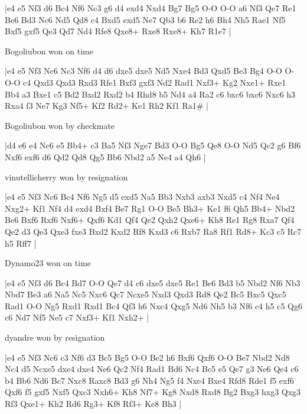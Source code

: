 \makegametitle
|e4 e5 Nf3 d6 Bc4 Nf6 Nc3 g6 d4 exd4 Nxd4 Bg7 Bg5 O-O O-O a6 Nf3 Qe7 Re1 Be6 Bd3 Nc6 Nd5 Qd8 c4 Bxd5 exd5 Ne7 Qb3 b6 Re2 h6 Bh4 Nh5 Rae1 Nf5 Bxf5 gxf5 Qe3 Qd7 Nd4 Rfe8 Qxe8+ Rxe8 Rxe8+ Kh7 R1e7  |

\showboard

Bogoliubon won on time

\makegametitle
|e4 e5 Nf3 Nc6 Nc3 Nf6 d4 d6 dxe5 dxe5 Nd5 Nxe4 Bd3 Qxd5 Be3 Bg4 O-O O-O-O c4 Qxd3 Qxd3 Rxd3 Rfe1 Bxf3 gxf3 Nd2 Rad1 Nxf3+ Kg2 Nxe1+ Rxe1 Bb4 a3 Bxe1 c5 Bd2 Bxd2 Rxd2 b4 Rhd8 b5 Nd4 a4 Ra2 c6 bxc6 bxc6 Nxc6 h3 Rxa4 f3 Ne7 Kg3 Nf5+ Kf2 Rd2+ Ke1 Rh2 Kf1 Ra1\#  |

\showboard

Bogoliubon won by checkmate

\makegametitle
|d4 e6 e4 Nc6 e5 Bb4+ c3 Ba5 Nf3 Nge7 Bd3 O-O Bg5 Qe8 O-O Nd5 Qc2 g6 Bf6 Nxf6 exf6 d6 Qd2 Qd8 Qg5 Bb6 Nbd2 a5 Ne4 a4 Qh6  |

\showboard

vinutellicherry won by resignation

\makegametitle
|e4 e5 Nf3 Nc6 Bc4 Nf6 Ng5 d5 exd5 Na5 Bb3 Nxb3 axb3 Nxd5 c4 Nf4 Ne4 Nxg2+ Kf1 Nf4 d4 exd4 Bxf4 Be7 Rg1 O-O Be5 Bh3+ Ke1 f6 Qh5 Bb4+ Nbd2 Be6 Bxf6 Rxf6 Nxf6+ Qxf6 Kd1 Qf4 Qe2 Qxh2 Qxe6+ Kh8 Re1 Rg8 Rxa7 Qf4 Qe2 d3 Qe3 Qxe3 fxe3 Bxd2 Kxd2 Rf8 Kxd3 c6 Rxb7 Ra8 Rf1 Rd8+ Kc3 c5 Rc7 h5 Rff7  |

\showboard

Dynamo23 won on time

\makegametitle
|e4 e5 Nf3 d6 Bc4 Bd7 O-O Qe7 d4 c6 dxe5 dxe5 Re1 Be6 Bd3 b5 Nbd2 Nf6 Nb3 Nbd7 Be3 a6 Na5 Nc5 Nxc6 Qc7 Ncxe5 Nxd3 Qxd3 Rd8 Qe2 Bc5 Bxc5 Qxc5 Rad1 O-O Ng5 Rxd1 Rxd1 Bc4 Qf3 h6 Nxc4 Qxg5 Nd6 Nh5 b3 Nf6 c4 h5 c5 Qg6 c6 Nd7 Nf5 Ne5 c7 Nxf3+ Kf1 Nxh2+  |

\showboard

dyandre won by resignation

\makegametitle
|e4 e5 Nf3 Nc6 c3 Nf6 d3 Bc5 Bg5 O-O Be2 h6 Bxf6 Qxf6 O-O Be7 Nbd2 Nd8 Nc4 d5 Ncxe5 dxe4 dxe4 Ne6 Qc2 Nf4 Rad1 Bd6 Nc4 Bc5 e5 Qe7 g3 Ne6 Qe4 c6 b4 Bb6 Nd6 Bc7 Nxc8 Raxc8 Bd3 g6 Nh4 Ng5 f4 Nxe4 Bxe4 Rfd8 Rde1 f5 exf6 Qxf6 f5 gxf5 Nxf5 Qxc3 Nxh6+ Kh8 Nf7+ Kg8 Nxd8 Rxd8 Bg2 Bxg3 hxg3 Qxg3 Rf3 Qxe1+ Kh2 Rd6 Rg3+ Kf8 Rf3+ Ke8 Bh3  |

